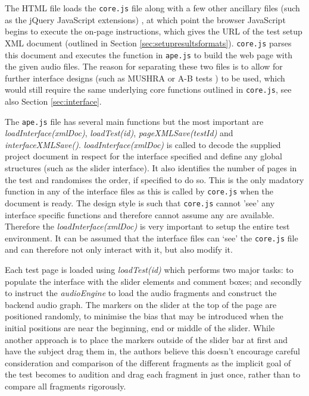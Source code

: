 \documentclass{article}
\begin{document}
The HTML file loads the \texttt{core.js} file along with a few other ancillary files (such as the jQuery JavaScript extensions)%
, at which point the browser JavaScript begins to execute the on-page instructions, which gives the URL of the test setup XML document (outlined in Section \ref{sec:setupresultsformats}). \texttt{core.js} parses this document and executes the function in \texttt{ape.js} to build the web page with the given audio files. The reason for separating these two files is to allow for further interface designs (such as MUSHRA \cite{mushra} or A-B tests \cite{bech}) to be used, which would still require the same underlying core functions outlined in \texttt{core.js}, see also Section \ref{sec:interface}.

The \texttt{ape.js} file has several main functions but the most important are \textit{loadInterface(xmlDoc)}, \textit{loadTest(id)}, \textit{pageXMLSave(testId)} and \textit{interfaceXMLSave()}. \textit{loadInterface(xmlDoc)} is called to decode the supplied project document in respect for the interface specified and define any global structures (such as the slider interface). It also identifies the number of pages in the test and randomises the order, if specified to do so. This is the only madatory function in any of the interface files as this is called by \texttt{core.js} when the document is ready. The design style is such that \texttt{core.js} cannot 'see' any interface specific functions and therefore cannot assume any are available. Therefore the \textit{loadInterface(xmlDoc)} is very important to setup the entire test environment. It can be assumed that the interface files can `see' the \texttt{core.js} file and can therefore not only interact with it, but also modify it.

Each test page is loaded using \textit{loadTest(id)} which performs two major tasks: to populate the interface with the slider elements and comment boxes; and secondly to instruct the \textit{audioEngine} to load the audio fragments and construct the backend audio graph. The markers on the slider at the top of the page are positioned randomly, to minimise the bias that may be introduced when the initial positions are near the beginning, end or middle of the slider. While another approach is to place the markers outside of the slider bar at first and have the subject drag them in, the authors believe this doesn't encourage careful consideration and comparison of the different fragments as the implicit goal of the test becomes to audition and drag each fragment in just once, rather than to compare all fragments rigorously.
\end{document}
